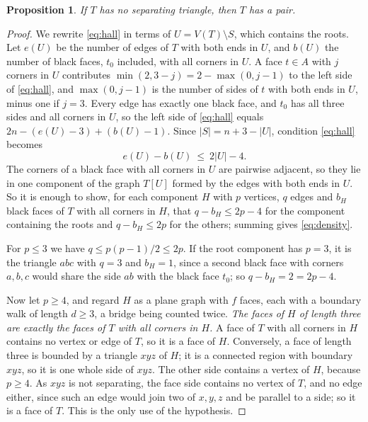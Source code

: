 \documentclass[10pt]{amsart}
\numberwithin{equation}{section}
\newtheorem{proposition}[equation]{Proposition}
\theoremstyle{definition}
\theoremstyle{remark}
\newcommand{\T}{T}
\begin{document}
\begin{proposition}\label{prop:pair}
If $\T$ has no separating triangle, then $\T$ has a pair.
\end{proposition}

\begin{proof}
We rewrite \eqref{eq:hall} in terms of $U=V(\T)\setminus S$, which contains the roots.
Let $e(U)$ be the number of edges of $\T$ with both ends in $U$, and $b(U)$ the number of black faces, $t_0$ included, with all corners in $U$.
A face $t\in A$ with $j$ corners in $U$ contributes $\min(2,3-j)=2-\max(0,j-1)$ to the left side of \eqref{eq:hall}, and $\max(0,j-1)$ is the number of sides of $t$ with both ends in $U$, minus one if $j=3$.
Every edge has exactly one black face, and $t_0$ has all three sides and all corners in $U$, so the left side of \eqref{eq:hall} equals $2n-(e(U)-3)+(b(U)-1)$.
Since $|S|=n+3-|U|$, condition \eqref{eq:hall} becomes
\begin{equation}\label{eq:density}
e(U)-b(U)\ \le\ 2|U|-4 .
\end{equation}
The corners of a black face with all corners in $U$ are pairwise adjacent, so they lie in one component of the graph $\T[U]$ formed by the edges with both ends in $U$.
So it is enough to show, for each component $H$ with $p$ vertices, $q$ edges and $b_H$ black faces of $\T$ with all corners in $H$, that $q-b_H\le 2p-4$ for the component containing the roots and $q-b_H\le 2p$ for the others; summing gives \eqref{eq:density}.

For $p\le3$ we have $q\le p(p-1)/2\le 2p$.
If the root component has $p=3$, it is the triangle $abc$ with $q=3$ and $b_H=1$, since a second black face with corners $a,b,c$ would share the side $ab$ with the black face $t_0$; so $q-b_H=2=2p-4$.

Now let $p\ge4$, and regard $H$ as a plane graph with $f$ faces, each with a boundary walk of length $d\ge3$, a bridge being counted twice.
\emph{The faces of $H$ of length three are exactly the faces of $\T$ with all corners in $H$.}
A face of $\T$ with all corners in $H$ contains no vertex or edge of $\T$, so it is a face of $H$.
Conversely, a face of length three is bounded by a triangle $xyz$ of $H$; it is a connected region with boundary $xyz$, so it is one whole side of $xyz$.
The other side contains a vertex of $H$, because $p\ge4$.
As $xyz$ is not separating, the face side contains no vertex of $\T$, and no edge either, since such an edge would join two of $x,y,z$ and be parallel to a side; so it is a face of $\T$.
This is the only use of the hypothesis.


\end{proof}
\end{document}
